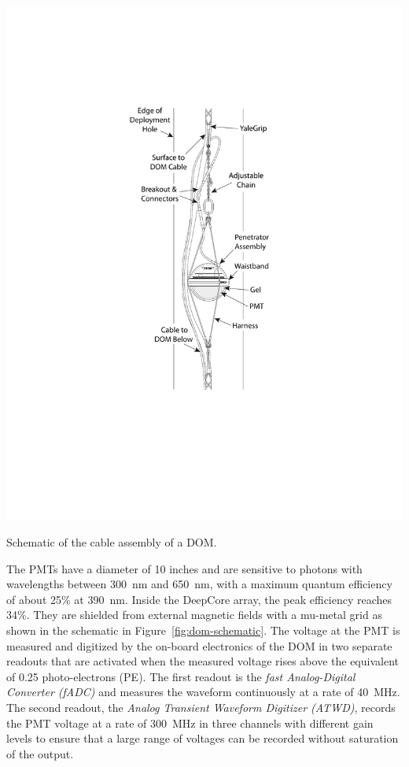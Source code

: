 \begin{marginfigure}
    \includegraphics[width=\textwidth]{figures/icecube/domfig2a-CableAssembly.pdf}
    \caption{Schematic of the cable assembly of a DOM.}
    \label{fig:dom-cable-assembly}
\end{marginfigure}
The PMTs have a diameter of 10 inches and are sensitive to photons with wavelengths between 300~nm and 650~nm, with a maximum quantum efficiency of about 25\% at 390~nm.
Inside the DeepCore array, the peak efficiency reaches 34\%.
They are shielded from external magnetic fields with a mu-metal grid as shown in the schematic in Figure~\ref{fig:dom-schematic}.
The voltage at the PMT is measured and digitized by the on-board electronics of the DOM in two separate readouts that are activated when the measured voltage rises above the equivalent of 0.25 photo-electrons (PE).
The first readout is the \emph{fast Analog-Digital Converter (fADC)} and measures the waveform continuously at a rate of 40~MHz.
The second readout, the \emph{Analog Transient Waveform Digitizer (ATWD)}, records the PMT voltage at a rate of 300~MHz in three channels with different gain levels to ensure that a large range of voltages can be recorded without saturation of the output.
